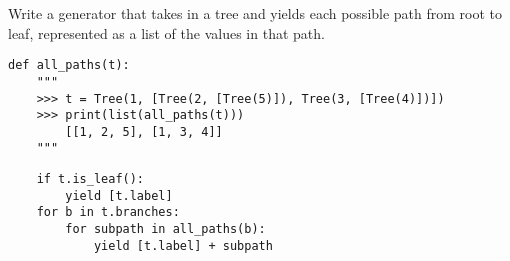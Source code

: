 \begin{blocksection}
\question Write a generator that takes in a tree and yields each possible path from root to leaf, represented as a list of the values in that path.
\newline

\begin{lstlisting}
def all_paths(t):
    """
    >>> t = Tree(1, [Tree(2, [Tree(5)]), Tree(3, [Tree(4)])])
    >>> print(list(all_paths(t)))
        [[1, 2, 5], [1, 3, 4]]
    """    
\end{lstlisting}

\begin{solution}[0.5in]
\begin{lstlisting}
    if t.is_leaf():
        yield [t.label]
    for b in t.branches:
        for subpath in all_paths(b):
            yield [t.label] + subpath
\end{lstlisting}

\end{solution}
\end{blocksection}
